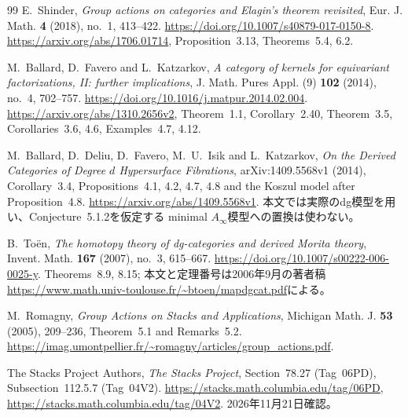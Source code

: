 \begin{thebibliography}{99}
E.~Shinder,
\emph{Group actions on categories and Elagin's theorem revisited},
Eur. J. Math. \textbf{4} (2018), no.~1, 413--422.
\url{https://doi.org/10.1007/s40879-017-0150-8}.
\url{https://arxiv.org/abs/1706.01714},
Proposition~3.13, Theorems~5.4, 6.2.

M.~Ballard, D.~Favero and L.~Katzarkov,
\emph{A category of kernels for equivariant factorizations, II: further implications},
J. Math. Pures Appl. (9) \textbf{102} (2014), no.~4, 702--757.
\url{https://doi.org/10.1016/j.matpur.2014.02.004}.
\url{https://arxiv.org/abs/1310.2656v2},
Theorem~1.1, Corollary~2.40, Theorem~3.5, Corollaries~3.6, 4.6, Examples~4.7, 4.12.

M.~Ballard, D.~Deliu, D.~Favero, M.~U.~Isik and L.~Katzarkov,
\emph{On the Derived Categories of Degree $d$ Hypersurface Fibrations},
arXiv:1409.5568v1 (2014), Corollary~3.4,
Propositions~4.1, 4.2, 4.7, 4.8 and the Koszul model after Proposition~4.8.
\url{https://arxiv.org/abs/1409.5568v1}.
本文では実際のdg模型を用い、Conjecture~5.1.2を仮定する
minimal $A_\infty$模型への置換は使わない。

B.~To\"en,
\emph{The homotopy theory of dg-categories and derived Morita theory},
Invent. Math. \textbf{167} (2007), no.~3, 615--667.
\url{https://doi.org/10.1007/s00222-006-0025-y}.
Theorems~8.9, 8.15; 本文と定理番号は2006年9月の著者稿
\url{https://www.math.univ-toulouse.fr/~btoen/mapdgcat.pdf}による。

M.~Romagny,
\emph{Group Actions on Stacks and Applications},
Michigan Math. J. \textbf{53} (2005), 209--236, Theorem~5.1 and Remarks~5.2.
\url{https://imag.umontpellier.fr/~romagny/articles/group_actions.pdf}.

The Stacks Project Authors,
\emph{The Stacks Project}, Section~78.27 (Tag~06PD),
Subsection~112.5.7 (Tag~04V2).
\url{https://stacks.math.columbia.edu/tag/06PD},
\url{https://stacks.math.columbia.edu/tag/04V2}.
2026年11月21日確認。


\end{thebibliography}
